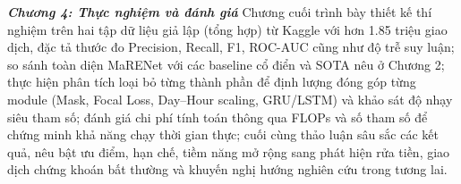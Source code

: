 \textit{\textbf{Chương 4: Thực nghiệm và đánh giá}}
Chương cuối trình bày thiết kế thí nghiệm trên hai tập dữ liệu giả lập (tổng hợp) từ Kaggle với hơn 1.85 triệu giao dịch, đặc tả thước đo Precision, Recall, F1, ROC-AUC cũng như độ trễ suy luận; so sánh toàn diện MaRENet với các baseline cổ điển và SOTA nêu ở Chương 2; thực hiện phân tích loại bỏ từng thành phần để định lượng đóng góp từng module (Mask, Focal Loss, Day–Hour scaling, GRU/LSTM) và khảo sát độ nhạy siêu tham số; đánh giá chi phí tính toán thông qua FLOPs và số tham số để chứng minh khả năng chạy thời gian thực; cuối cùng thảo luận sâu sắc các kết quả, nêu bật ưu điểm, hạn chế, tiềm năng mở rộng sang phát hiện rửa tiền, giao dịch chứng khoán bất thường và khuyến nghị hướng nghiên cứu trong tương lai.






